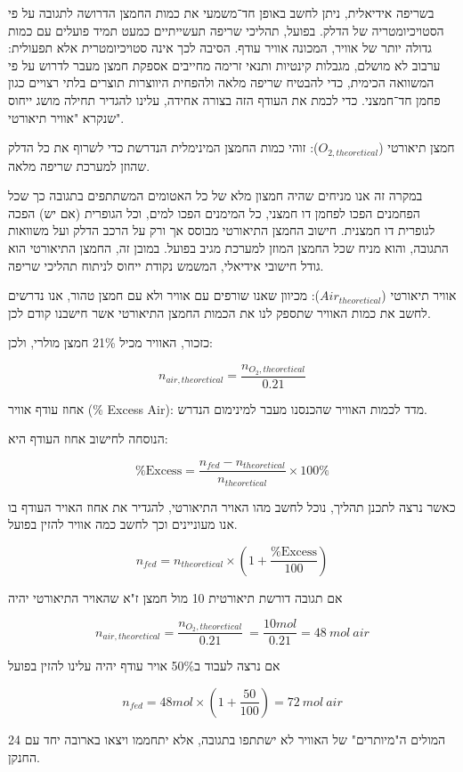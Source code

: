 \documentclass[
  hebrew,
  letterpaper,
  DIV=11,
  numbers=noendperiod]{scrreprt}
\begin{document}
בשריפה אידיאלית, ניתן לחשב באופן חד־משמעי את כמות החמצן הדרושה לתגובה על
פי הסטויכיומטריה של הדלק. בפועל, תהליכי שריפה תעשייתיים כמעט תמיד פועלים
עם כמות גדולה יותר של אוויר, המכונה אוויר עודף. הסיבה לכך אינה
סטויכיומטרית אלא תפעולית: ערבוב לא מושלם, מגבלות קינטיות ותנאי זרימה
מחייבים אספקת חמצן מעבר לדרוש על פי המשוואה הכימית, כדי להבטיח שריפה
מלאה ולהפחית היווצרות תוצרים בלתי רצויים כגון פחמן חד־חמצני. כדי לכמת את
העודף הזה בצורה אחידה, עלינו להגדיר תחילה מושג ייחוס שנקרא "אוויר
תיאורטי".

חמצן תיאורטי (\(O_{2,theoretical}\)): זוהי כמות החמצן המינימלית הנדרשת
כדי לשרוף את כל הדלק שהוזן למערכת שריפה מלאה.

במקרה זה אנו מניחים שהיה חמצון מלא של כל האטומים המשתתפים בתגובה כך שכל
הפחמנים הפכו לפחמן דו חמצני, כל המימנים הפכו למים, וכל הגופרית (אם יש)
הפכה לגופרית דו חמצנית. חישוב החמצן התיאורטי מבוסס אך ורק על הרכב הדלק
ועל משוואות התגובה, והוא מניח שכל החמצן המוזן למערכת מגיב בפועל. במובן
זה, החמצן התיאורטי הוא גודל חישובי אידיאלי, המשמש נקודת ייחוס לניתוח
תהליכי שריפה.

אוויר תיאורטי (\(Air_{theoretical}\)): מכיוון שאנו שורפים עם אוויר ולא
עם חמצן טהור, אנו נדרשים לחשב את כמות האוויר שתספק לנו את הכמות החמצן
התיאורטי אשר חישבנו קודם לכן.

כזכור, האוויר מכיל 21\% חמצן מולרי, ולכן:

\[n_{air,theoretical} = \frac{n_{O_{2},theoretical}}{0.21}\]

אחוז עודף אוויר (\% Excess Air): מדד לכמות האוויר שהכנסנו מעבר למינימום
הנדרש.

הנוסחה לחישוב אחוז העודף היא:

\[\%\text{Excess} = \frac{n_{fed} - n_{theoretical}}{n_{theoretical}} \times 100\%\]

כאשר נרצה לתכנן תהליך, נוכל לחשב מהו האויר התיאורטי, להגדיר את אחוז
האויר העודף בו אנו מעוניינים וכך לחשב כמה אוויר להזין בפועל.

\[n_{fed} = n_{theoretical} \times \left( 1 + \frac{\%\text{Excess}}{100} \right)\]

אם תגובה דורשת תיאורטית 10 מול חמצן ז"א שהאויר התיאורטי יהיה

\[n_{air,theoretical} = \frac{n_{O_{2},theoretical}}{0.21}\  = \frac{10mol}{0.21} = 48\ mol\ air\]

אם נרצה לעבוד ב50\% אויר עודף יהיה עלינו להזין בפועל

\[n_{fed} = 48mol \times \left( 1 + \frac{50}{100} \right) = 72\ mol\ air\]

24 המולים ה"מיותרים" של האוויר לא ישתתפו בתגובה, אלא יתחממו ויצאו בארובה
יחד עם החנקן.
\end{document}
